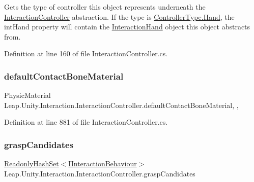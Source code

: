 Gets the type of controller this object represents underneath the \mbox{\hyperlink{class_leap_1_1_unity_1_1_interaction_1_1_interaction_controller}{Interaction\+Controller}} abstraction. If the type is \mbox{\hyperlink{namespace_leap_1_1_unity_1_1_interaction_a9752eb3e2905e8ebd134fff20c155e6baa78b1ac16c0cd02168097fc9a9bd7604}{Controller\+Type.\+Hand}}, the int\+Hand property will contain the \mbox{\hyperlink{class_leap_1_1_unity_1_1_interaction_1_1_interaction_hand}{Interaction\+Hand}} object this object abstracts from. 



Definition at line 160 of file Interaction\+Controller.\+cs.

\mbox{\label{class_leap_1_1_unity_1_1_interaction_1_1_interaction_controller_ab4e6b3b0d4793ea376619f9dc452b9f4}} 
\subsubsection{\texorpdfstring{defaultContactBoneMaterial}{defaultContactBoneMaterial}}
{\footnotesize\ttfamily Physic\+Material Leap.\+Unity.\+Interaction.\+Interaction\+Controller.\+default\+Contact\+Bone\+Material\hspace{0.3cm}{\ttfamily [static]}, {\ttfamily [get]}, {\ttfamily [protected]}}



Definition at line 881 of file Interaction\+Controller.\+cs.

\mbox{\label{class_leap_1_1_unity_1_1_interaction_1_1_interaction_controller_a7b07298222ede0d272988129488ef445}} 
\subsubsection{\texorpdfstring{graspCandidates}{graspCandidates}}
{\footnotesize\ttfamily \mbox{\hyperlink{struct_leap_1_1_unity_1_1_readonly_hash_set}{Readonly\+Hash\+Set}}$<$\mbox{\hyperlink{interface_leap_1_1_unity_1_1_interaction_1_1_i_interaction_behaviour}{I\+Interaction\+Behaviour}}$>$ Leap.\+Unity.\+Interaction.\+Interaction\+Controller.\+grasp\+Candidates\hspace{0.3cm}{\ttfamily [get]}}



